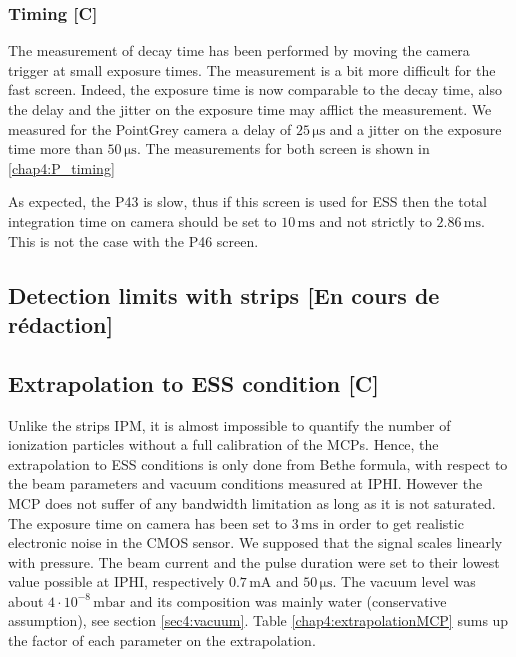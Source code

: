 \begin{refsection}
  

  \subsubsection{Timing [C]}
  The measurement of decay time has been performed by moving the camera trigger at small exposure times. The measurement is a bit more difficult for the fast screen. Indeed, the exposure time is now comparable to the decay time, also the delay and the jitter on the exposure time may afflict the measurement.
  We measured for the PointGrey camera a delay of $25\,\mathrm{\mu s}$ and a jitter on the exposure time more than $50\,\mathrm{\mu s}$. The measurements for both screen is shown in \ref{chap4:P_timing}

  

  As expected, the P43 is slow, thus if this screen is used for ESS then the total integration time on camera should be set to $10\,\mathrm{ms}$ and not strictly to $2.86\,\mathrm{ms}$. This is not the case with the P46 screen.

  \subsection{Detection limits with strips [En cours de rédaction]}

  \subsection{Extrapolation to ESS condition [C]}
  Unlike the strips IPM, it is almost impossible to quantify the number of ionization particles without a full calibration of the MCPs. Hence, the extrapolation to ESS conditions is only done from Bethe formula, with respect to the beam parameters and vacuum conditions measured at IPHI.
  However the MCP does not suffer of any bandwidth limitation as long as it is not saturated. The exposure time on camera has been set to $3\,\mathrm{ms}$ in order to get realistic electronic noise in the CMOS sensor.
  We supposed that the signal scales linearly with pressure. The beam current and the pulse duration were set to their lowest value possible at IPHI, respectively $0.7\,\mathrm{mA}$ and $50\, \mathrm{\mu s}$. The vacuum level was about $4 \cdot 10^{-8}\,\mathrm{mbar}$ and its composition was mainly water (conservative assumption), see section \ref{sec4:vacuum}. Table \ref{chap4:extrapolationMCP} sums up the factor of each parameter on the extrapolation.
  


\end{refsection}
